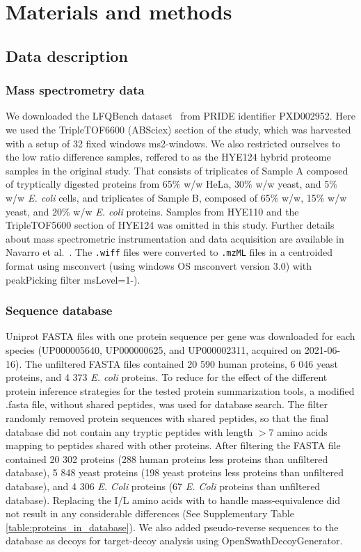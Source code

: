 \documentclass[10pt,letterpaper]{article}
\begin{document}
 
\section*{Materials and methods}


\subsection*{Data description}
\subsubsection*{Mass spectrometry data}


We downloaded the LFQBench dataset~\cite{navarro2016multicenter} from PRIDE identifier PXD002952. Here we used the TripleTOF6600 (ABSciex) section of the study, which was harvested with a setup of 32 fixed windows ms2-windows. We also restricted ourselves to the low ratio difference samples, reffered to as the HYE124 hybrid proteome samples in the original study. That consists of triplicates of Sample A composed of tryptically digested proteins from 65\% w/w HeLa, 30\% w/w yeast, and 5\% w/w \textit{E. coli} cells, and triplicates of Sample B, composed of 65\% w/w, 15\% w/w yeast, and 20\% w/w \textit{E. coli} proteins. Samples from HYE110 and the TripleTOF5600 section of HYE124 was omitted in this study. Further details about mass spectrometric instrumentation and data acquisition are available in Navarro et al.~\cite{navarro2016multicenter}. The \verb|.wiff| files were converted to \verb|.mzML| files in a centroided format using msconvert (using windows OS msconvert version 3.0) with peakPicking filter msLevel=1-). 


\subsubsection*{Sequence database}

Uniprot FASTA files with one protein sequence per gene was downloaded for each species (UP000005640, UP000000625, and UP000002311, acquired on 2021-06-16). The unfiltered FASTA files contained 20 590 human proteins, 6 046 yeast proteins, and 4 373 \textit{E. coli} proteins. To reduce for the effect of the different protein inference strategies for the tested protein summarization tools, a modified .fasta file, without shared peptides, was used for database search. The filter randomly removed protein sequences with shared peptides, so that the final database did not contain any tryptic peptides with length $>$7 amino acids mapping to peptides shared with other proteins. After filtering the FASTA file contained 20 302 proteins (288 human proteins less proteins than unfiltered database), 5 848 yeast proteins (198 yeast proteins less proteins than unfiltered database), and 4 306 \textit{E. Coli} proteins (67 \textit{E. Coli} proteins than unfiltered database). Replacing the I/L amino acids with to handle mass-equivalence did not result in any considerable differences (See Supplementary Table \ref{table:proteins_in_database}). We also added pseudo-reverse sequences to the database as decoys for target-decoy analysis using OpenSwathDecoyGenerator. 
\end{document}
